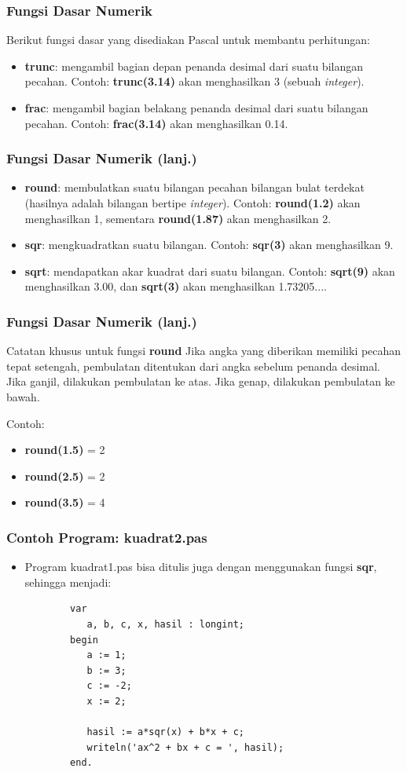 \documentclass{beamer}
\begin{document}
\begin{frame}
\frametitle{Fungsi Dasar Numerik}
Berikut fungsi dasar yang disediakan Pascal untuk membantu perhitungan:
\begin{itemize}
	\item \textbf{trunc}: mengambil bagian depan penanda desimal dari suatu bilangan pecahan. Contoh: \textbf{trunc(3.14)} akan menghasilkan 3 (sebuah \textit{integer}).
	\item \textbf{frac}: mengambil bagian belakang penanda desimal dari suatu bilangan pecahan. Contoh: \textbf{frac(3.14)} akan menghasilkan 0.14.
\end{itemize}
\end{frame}

\begin{frame}
\frametitle{Fungsi Dasar Numerik (lanj.)}
\begin{itemize}
	\item \textbf{round}: membulatkan suatu bilangan pecahan bilangan bulat terdekat (hasilnya adalah bilangan bertipe \textit{integer}). Contoh: \textbf{round(1.2)} akan menghasilkan 1, sementara \textbf{round(1.87)} akan menghasilkan 2. 
	\item \textbf{sqr}: mengkuadratkan suatu bilangan. Contoh: \textbf{sqr(3)} akan menghasilkan 9.
	\item \textbf{sqrt}: mendapatkan akar kuadrat dari suatu bilangan. Contoh: \textbf{sqrt(9)} akan menghasilkan 3.00, dan \textbf{sqrt(3)} akan menghasilkan 1.73205....
\end{itemize}
\end{frame}

\begin{frame}
\frametitle{Fungsi Dasar Numerik (lanj.)}
\begin{block}{Catatan khusus untuk fungsi \textbf{round}}
Jika angka yang diberikan memiliki pecahan tepat setengah, pembulatan ditentukan dari angka sebelum penanda desimal. Jika ganjil, dilakukan pembulatan ke atas. Jika genap, dilakukan pembulatan ke bawah. 

Contoh:
\begin{itemize}
\item \textbf{round(1.5)} = 2
\item \textbf{round(2.5)} = 2
\item \textbf{round(3.5)} = 4
\end{itemize}
\end{block}
\end{frame}

\begin{frame}[fragile]
\frametitle{Contoh Program: kuadrat2.pas}
\begin{itemize}
	\item Program kuadrat1.pas bisa ditulis juga dengan menggunakan fungsi \textbf{sqr}, sehingga menjadi:
	\begin{lstlisting}
		var
		   a, b, c, x, hasil : longint;
		begin
		   a := 1;
		   b := 3;
		   c := -2;
		   x := 2;
		
		   hasil := a*sqr(x) + b*x + c;
		   writeln('ax^2 + bx + c = ', hasil);
		end.
	\end{lstlisting}
\end{itemize}
\end{frame}
\end{document}
